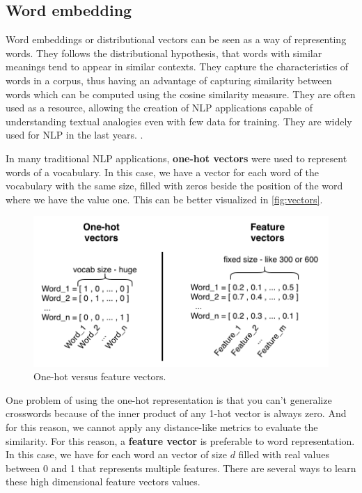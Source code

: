 \subsection{Word embedding}\label{chap:background:we}

Word embeddings or distributional vectors can be seen as a way of representing words. They follows the distributional hypothesis, that words with similar meanings tend to appear in similar contexts. They capture the characteristics of words in a corpus, thus having an advantage of capturing similarity between words which can be computed using the cosine similarity measure. They are often used as a resource, allowing the creation of NLP applications capable of understanding textual analogies even with few data for training. They are widely used for NLP in the last years. \cite{DBLP:journals/corr/abs-1708-02709, Harris1954, Hartmann2017}.


In many traditional NLP applications, \textbf{one-hot vectors} were used to represent words of a vocabulary. In this case, we have a vector for each word of the vocabulary with the same size, filled with zeros beside the position of the word where we have the value one. This can be better visualized in \autoref{fig:vectors}. 

\begin{figure}[h]
	\caption{One-hot versus feature vectors.}
	\label{fig:vectors}
	\centering%
	\begin{minipage}{.7\textwidth}
		\includegraphics[width=\textwidth]{vectors.png}
	\end{minipage}
\end{figure}


One problem of using the one-hot representation is that you can't generalize crosswords because of the inner product of any 1-hot vector is always zero. And for this reason, we cannot apply any distance-like metrics to evaluate the similarity. For this reason, a \textbf{feature vector} is preferable to word representation. In this case, we have for each word an vector of size $d$ filled with real values between 0 and 1 that represents multiple features. There are several ways to learn these high dimensional feature vectors values.



